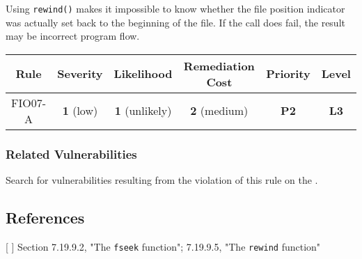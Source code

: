    Using {\tt rewind()} makes it impossible to know whether the file position indicator was actually set back to the beginning of the file. If the call does fail, the result may be incorrect program flow.

   \begin{tabular}[c]{| c| c| c| c| c| c|}
   \hline
   {\bf Rule} & {\bf Severity} & {\bf Likelihood} & {\bf Remediation Cost} & {\bf Priority} & {\bf Level} \\ \hline
   FIO07-A & {\bf 1} (low) & {\bf 1} (unlikely) & {\bf 2} (medium) & {\bf P2} & {\bf L3} \\ \hline
   \end{tabular}
   \subsubsection{Related Vulnerabilities}

   Search for vulnerabilities resulting from the violation of this rule on the  .
   \subsection{References}

   [  ] Section 7.19.9.2, "The {\tt fseek} function"; 7.19.9.5, "The {\tt rewind} function"
